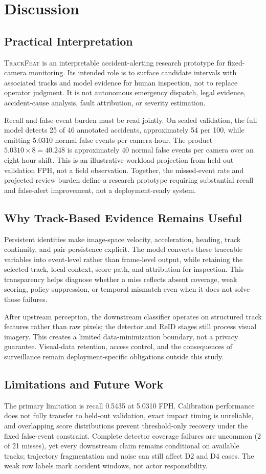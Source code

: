 \documentclass[letterpaper]{article}
\newcommand{\method}{\textsc{TrackFeat}}
\begin{document}
\section{Discussion}
\subsection{Practical Interpretation}
\method{} is an interpretable accident-alerting research prototype for fixed-camera monitoring. Its intended role is to surface candidate intervals with associated tracks and model evidence for human inspection, not to replace operator judgment. It is not autonomous emergency dispatch, legal evidence, accident-cause analysis, fault attribution, or severity estimation.

Recall and false-event burden must be read jointly. On sealed validation, the full model detects 25 of 46 annotated accidents, approximately 54 per 100, while emitting 5.0310 normal false events per camera-hour. The product $5.0310\times8=40.248$ is approximately 40 normal false events per camera over an eight-hour shift. This is an illustrative workload projection from held-out validation FPH, not a field observation. Together, the missed-event rate and projected review burden define a research prototype requiring substantial recall and false-alert improvement, not a deployment-ready system.

\subsection{Why Track-Based Evidence Remains Useful}
Persistent identities make image-space velocity, acceleration, heading, track continuity, and pair persistence explicit. The model converts these traceable variables into event-level rather than frame-level output, while retaining the selected track, local context, score path, and attribution for inspection. This transparency helps diagnose whether a miss reflects absent coverage, weak scoring, policy suppression, or temporal mismatch even when it does not solve those failures.

After upstream perception, the downstream classifier operates on structured track features rather than raw pixels; the detector and ReID stages still process visual imagery. This creates a limited data-minimization boundary, not a privacy guarantee. Visual-data retention, access control, and the consequences of surveillance remain deployment-specific obligations outside this study.

\subsection{Limitations and Future Work}
The primary limitation is recall 0.5435 at 5.0310 FPH. Calibration performance does not fully transfer to held-out validation, exact impact timing is unreliable, and overlapping score distributions prevent threshold-only recovery under the fixed false-event constraint. Complete detector coverage failures are uncommon (2 of 21 misses), yet every downstream claim remains conditional on available tracks; trajectory fragmentation and noise can still affect D2 and D4 cases. The weak row labels mark accident windows, not actor responsibility.
\end{document}

